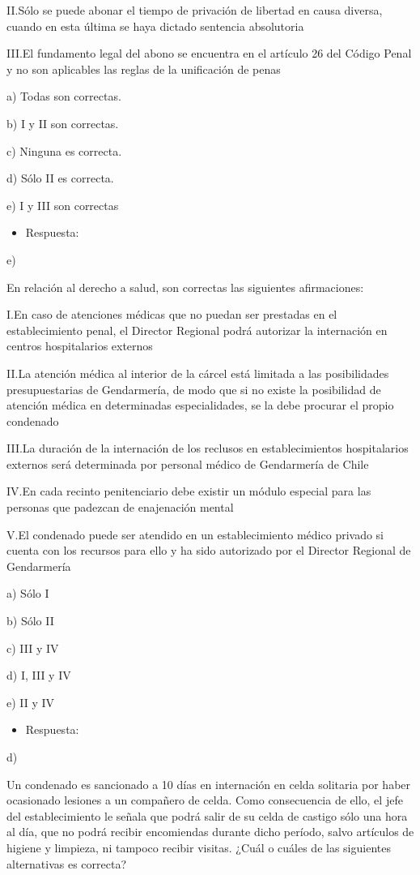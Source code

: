 \documentclass[letterpaper, 11pt]{article}
\begin{document}
II.Sólo se puede abonar el tiempo de privación de libertad en causa diversa, cuando
en esta última se haya dictado sentencia absolutoria

III.El fundamento legal del abono se encuentra en el artículo 26 del Código Penal y no
son aplicables las reglas de la unificación de penas

a) Todas son correctas.

b) I y II son correctas.

c) Ninguna es correcta.

d) Sólo II es correcta.

e) I y III son correctas

\begin{itemize}
\item Respuesta:
\end{itemize}
e)


En relación al derecho a salud, son correctas las siguientes afirmaciones:

I.En caso de atenciones médicas que no puedan ser prestadas en el establecimiento
penal, el Director Regional podrá autorizar la internación en centros hospitalarios
externos

II.La atención médica al interior de la cárcel está limitada a las posibilidades
presupuestarias de Gendarmería, de modo que si no existe la posibilidad de
atención médica en determinadas especialidades, se la debe procurar el propio
condenado

III.La duración de la internación de los reclusos en establecimientos hospitalarios
externos será determinada por personal médico de Gendarmería de Chile

IV.En cada recinto penitenciario debe existir un módulo especial para las personas
que padezcan de enajenación mental

V.El condenado puede ser atendido en un establecimiento médico privado si cuenta
con los recursos para ello y ha sido autorizado por el Director Regional de
Gendarmería

a) Sólo I

b) Sólo II

c) III y IV

d) I, III y IV

e) II y IV

\begin{itemize}
\item Respuesta:
\end{itemize}
d)

Un condenado es sancionado a 10 días en internación en celda solitaria por
haber ocasionado lesiones a un compañero de celda. Como consecuencia de
ello, el jefe del establecimiento le señala que podrá salir de su celda de castigo
sólo una hora al día, que no podrá recibir encomiendas durante dicho período,
salvo artículos de higiene y limpieza, ni tampoco recibir visitas. ¿Cuál o cuáles
de las siguientes alternativas es correcta?
\end{document}
